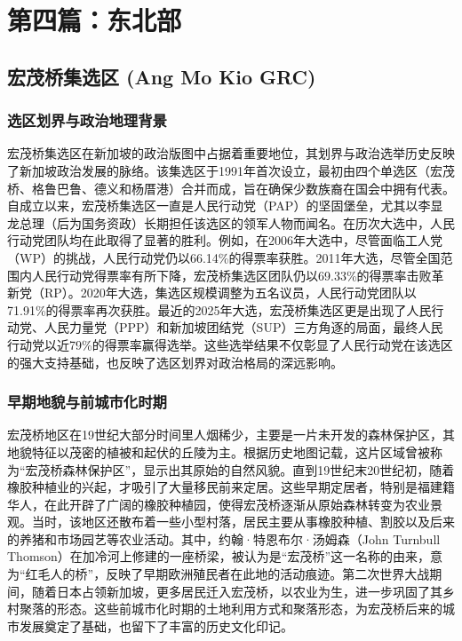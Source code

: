 \documentclass[11pt,a4paper,twoside,openany]{book}
\begin{document}
\part{第四篇：东北部}

\chapter{宏茂桥集选区 (Ang Mo Kio GRC)}

\section{选区划界与政治地理背景}
宏茂桥集选区在新加坡的政治版图中占据着重要地位，其划界与政治选举历史反映了新加坡政治发展的脉络。该集选区于1991年首次设立，最初由四个单选区（宏茂桥、格鲁巴鲁、德义和杨厝港）合并而成，旨在确保少数族裔在国会中拥有代表。自成立以来，宏茂桥集选区一直是人民行动党（PAP）的坚固堡垒，尤其以李显龙总理（后为国务资政）长期担任该选区的领军人物而闻名。在历次大选中，人民行动党团队均在此取得了显著的胜利。例如，在2006年大选中，尽管面临工人党（WP）的挑战，人民行动党仍以66.14\%的得票率获胜。2011年大选，尽管全国范围内人民行动党得票率有所下降，宏茂桥集选区团队仍以69.33\%的得票率击败革新党（RP）。2020年大选，集选区规模调整为五名议员，人民行动党团队以71.91\%的得票率再次获胜。最近的2025年大选，宏茂桥集选区更是出现了人民行动党、人民力量党（PPP）和新加坡团结党（SUP）三方角逐的局面，最终人民行动党以近79\%的得票率赢得选举。这些选举结果不仅彰显了人民行动党在该选区的强大支持基础，也反映了选区划界对政治格局的深远影响。

\section{早期地貌与前城市化时期}
宏茂桥地区在19世纪大部分时间里人烟稀少，主要是一片未开发的森林保护区，其地貌特征以茂密的植被和起伏的丘陵为主。根据历史地图记载，这片区域曾被称为“宏茂桥森林保护区”，显示出其原始的自然风貌。直到19世纪末20世纪初，随着橡胶种植业的兴起，才吸引了大量移民前来定居。这些早期定居者，特别是福建籍华人，在此开辟了广阔的橡胶种植园，使得宏茂桥逐渐从原始森林转变为农业景观。当时，该地区还散布着一些小型村落，居民主要从事橡胶种植、割胶以及后来的养猪和市场园艺等农业活动。其中，约翰·特恩布尔·汤姆森（John Turnbull Thomson）在加冷河上修建的一座桥梁，被认为是“宏茂桥”这一名称的由来，意为“红毛人的桥”，反映了早期欧洲殖民者在此地的活动痕迹。第二次世界大战期间，随着日本占领新加坡，更多居民迁入宏茂桥，以农业为生，进一步巩固了其乡村聚落的形态。这些前城市化时期的土地利用方式和聚落形态，为宏茂桥后来的城市发展奠定了基础，也留下了丰富的历史文化印记。
\end{document}
